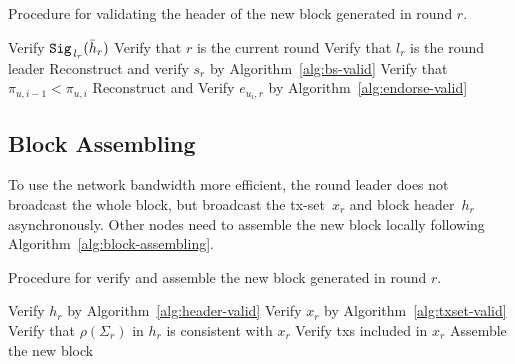 \documentclass{article}
\begin{document}
\begin{algorithm}[H]
\caption{Procedure for validating the header of the new block generated in round $r$.}
\label{alg:header-valid}
\begin{spacing}{1.2}
\begin{algorithmic}[1]
    \vspace{1ex}
    \State Verify ${\tt Sig}_{\,l_r}(\bar{h}_r)$
    \State Verify that $r$ is the current round
    \State Verify that $l_r$ is the round leader
    \State Reconstruct and verify $s_r$ by Algorithm~\ref{alg:bs-valid}
            \State Verify that $\pi_{u,i-1} < \pi_{u,i}$
        \EndIf
        \State Reconstruct and Verify $e_{u_i,r}$ by Algorithm~\ref{alg:endorse-valid}
    \EndFor
\end{algorithmic}
\end{spacing}
\end{algorithm}

\subsection{Block Assembling}
To use the network bandwidth more efficient, the round leader does not broadcast the whole block, but broadcast the tx-set~$x_r$ and block header~$h_r$ asynchronously. Other nodes need to assemble the new block locally following Algorithm~\ref{alg:block-assembling}.

\begin{algorithm}[H]
\caption{Procedure for verify and assemble the new block generated in round $r$.}
\label{alg:block-assembling}
\begin{spacing}{1.2}
\begin{algorithmic}[1]
    \vspace{1ex}
    \State Verify $h_r$ by Algorithm~\ref{alg:header-valid}
    \State Verify $x_r$ by Algorithm~\ref{alg:txset-valid}
    \State Verify that $\rho(\Sigma_r)$ in $h_r$ is consistent with $x_r$
    \State Verify txs included in $x_r$
    \State Assemble the new block
\end{algorithmic}
\end{spacing}
\end{algorithm}

\end{document}
